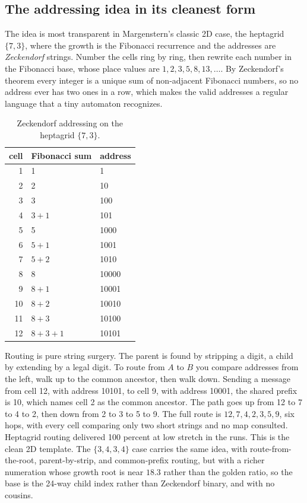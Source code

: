 \subsection{The addressing idea in its cleanest form}

The idea is most transparent in Margenstern's classic 2D case, the heptagrid $\{7,3\}$, where the growth is the Fibonacci recurrence and the addresses are \emph{Zeckendorf} strings. Number the cells ring by ring, then rewrite each number in the Fibonacci base, whose place values are $1, 2, 3, 5, 8, 13, \ldots$. By Zeckendorf's theorem every integer is a unique sum of non-adjacent Fibonacci numbers, so no address ever has two ones in a row, which makes the valid addresses a regular language that a tiny automaton recognizes.

\begin{table}[ht]
\centering
\begin{tabular}{@{}rll@{}}
\toprule
cell & Fibonacci sum & address \\
\midrule
1  & 1         & 1 \\
2  & 2         & 10 \\
3  & 3         & 100 \\
4  & $3 + 1$     & 101 \\
5  & 5         & 1000 \\
6  & $5 + 1$     & 1001 \\
7  & $5 + 2$     & 1010 \\
8  & 8         & 10000 \\
9  & $8 + 1$     & 10001 \\
10 & $8 + 2$     & 10010 \\
11 & $8 + 3$     & 10100 \\
12 & $8 + 3 + 1$ & 10101 \\
\bottomrule
\end{tabular}
\caption{Zeckendorf addressing on the heptagrid $\{7,3\}$.}
\end{table}

Routing is pure string surgery. The parent is found by stripping a digit, a child by extending by a legal digit. To route from $A$ to $B$ you compare addresses from the left, walk up to the common ancestor, then walk down. Sending a message from cell 12, with address 10101, to cell 9, with address 10001, the shared prefix is 10, which names cell 2 as the common ancestor. The path goes up from 12 to 7 to 4 to 2, then down from 2 to 3 to 5 to 9. The full route is $12, 7, 4, 2, 3, 5, 9$, six hops, with every cell comparing only two short strings and no map consulted. Heptagrid routing delivered 100 percent at low stretch in the runs. This is the clean 2D template. The $\{3,4,3,4\}$ case carries the same idea, with route-from-the-root, parent-by-strip, and common-prefix routing, but with a richer numeration whose growth root is near $18.3$ rather than the golden ratio, so the base is the 24-way child index rather than Zeckendorf binary, and with no cousins.

